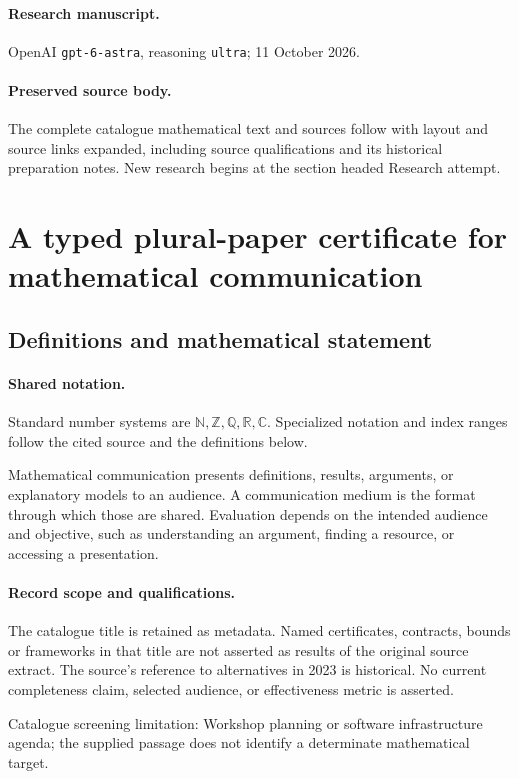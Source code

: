 \documentclass[11pt]{article}
\begin{document}
\paragraph{Research manuscript.} OpenAI \texttt{gpt-6-astra}, reasoning \texttt{ultra}; 11 October 2026.
\paragraph{Preserved source body.} The complete catalogue mathematical text and sources follow with layout and source links expanded, including source qualifications and its historical preparation notes. New research begins at the section headed Research attempt.

\section{A typed plural-paper certificate for mathematical communication}\label{statement}

\subsection{Definitions and mathematical statement}

\paragraph{Shared notation.}Standard number systems are $\mathbb N,\mathbb Z,\mathbb Q,\mathbb R,\mathbb C$. Specialized notation and index ranges follow the cited source and the definitions below.


Mathematical communication presents definitions, results, arguments, or explanatory models to an audience. A communication medium is the format through which those are shared. Evaluation depends on the intended audience and objective, such as understanding an argument, finding a resource, or accessing a presentation.
\paragraph{Record scope and qualifications.}
The catalogue title is retained as metadata. Named certificates, contracts, bounds or frameworks in that title are not asserted as results of the original source extract.
The source's reference to alternatives in 2023 is historical. No current completeness claim, selected audience, or effectiveness metric is asserted.

Catalogue screening limitation: Workshop planning or software infrastructure agenda; the supplied passage does not identify a determinate mathematical target.
\end{document}
